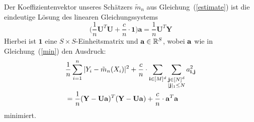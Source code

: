 \begin{lem}
Der Koeffizientenvektor unseres Schätzers $\tilde{m}_n$ aus Gleichung~(\ref{estimate}) ist die eindeutige Lösung des linearen Gleichungssystems 
\begin{equation}	
\label{les}
\bigg(\frac{1}{n}\mathbf{U}^T\mathbf{U} + \frac{c}{n} \cdot \mathbf{1} \bigg) \mathbf{a} = \frac{1}{n} \mathbf{U}^T\mathbf{Y}
\end{equation}
Hierbei ist $\mathbf{1}$ eine $S \times S$-Einheitsmatrix und $\mathbf{a} \in \mathbb{R}^S$, wobei $\mathbf{a}$ wie in Gleichung~(\ref{min}) den Ausdruck:
\begin{equation}
\label{eq:min}
\begin{split}
& \frac{1}{n} \sum_{i = 1}^n|Y_i - \tilde{m}_n(X_i)|^2 + \frac{c}{n} \cdot \sum_{\mathbf{i} \in [M]^d} \sum_{\substack{\mathbf{j} \in [N]^d\\|\mathbf{j}|_1 \leq N}} a_{\mathbf{i},\mathbf{j}}^2 \\
& = \frac{1}{n}(\mathbf{Y} - \mathbf{U}\mathbf{a})^T(\mathbf{Y} - \mathbf{U}\mathbf{a}) + \frac{c}{n} \cdot \mathbf{a}^T\mathbf{a}
\end{split}
\end{equation}
minimiert.
\end{lem}
